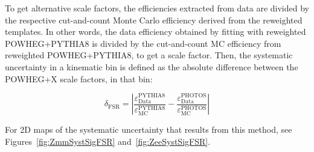 {To get alternative scale factors, the efficiencies extracted from data are divided by the respective cut-and-count Monte Carlo efficiency derived from the reweighted templates.
In other words, the data efficiency obtained by fitting with reweighted POWHEG+PYTHIA8 is divided by the cut-and-count MC efficiency from reweighted POWHEG+PYTHIA8, to get a scale factor.
Then, the systematic uncertainty in a kinematic bin is defined as the absolute difference between the POWHEG+X scale factors, in that bin:

\begin{equation}
\delta_{\mathrm{FSR}} = \left| \frac{\varepsilon^{\mathrm{PYTHIA8}}_{\mathrm{Data}}}{\varepsilon^{\mathrm{PYTHIA8}}_{\mathrm{MC}}} - \frac{\varepsilon^{\mathrm{PHOTOS}}_{\mathrm{Data}}}{\varepsilon^{\mathrm{PHOTOS}}_{\mathrm{MC}}} \right|
\end{equation}

For 2D maps of the systematic uncertainty that results from this method, see Figures~\ref{fig:ZmmSystSigFSR} and~\ref{fig:ZeeSystSigFSR}.

}
